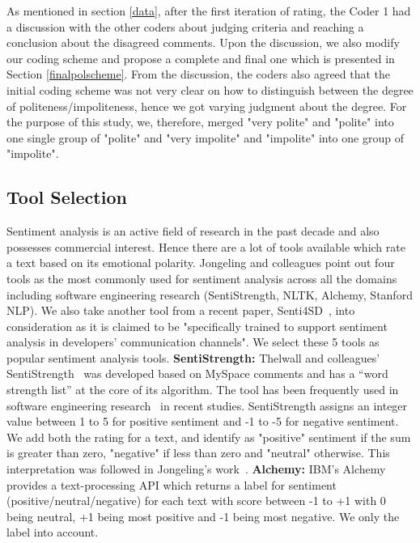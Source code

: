 As mentioned in section \ref{data}, after the first iteration of rating, the Coder 1 had a discussion with the other coders about judging criteria and reaching a conclusion about the disagreed comments. Upon the discussion, we also modify our coding scheme and propose a complete and final one which is presented in Section \ref{finalpolscheme}. From the discussion, the coders also agreed that the initial coding scheme was not very clear on how to distinguish between the degree of politeness/impoliteness, hence we got varying judgment about the degree. For the purpose of this study, we, therefore, merged "very polite" and "polite" into one single group of "polite" and "very impolite" and "impolite" into one group of "impolite".

\subsection{Tool Selection}
Sentiment analysis is an active field of research in the past decade and also possesses commercial interest. Hence there are a lot of tools available which rate a text based on its emotional polarity. Jongeling and colleagues point out four tools as the most commonly used for sentiment analysis across all the domains including software engineering research (SentiStrength, NLTK, Alchemy, Stanford NLP). We also take another tool from a recent paper, Senti4SD~\cite{calefato2017sentiment}, into consideration as it is claimed to be "specifically trained to support sentiment analysis in developers' communication channels". We select these 5 tools as popular sentiment analysis tools.
\newline
\indent \textbf{SentiStrength:} Thelwall and colleagues' SentiStrength~\cite{thelwall2010sentiment} 
was developed based on MySpace comments and 
has a ``word strength list'' at the core of its algorithm. 
The tool has been frequently used in software engineering research~\cite{garcia2013role,guzman2014sentiment,novielli2015challenges,guzman2013towards} in recent studies. SentiStrength assigns an integer value between 1 to 5 for positive sentiment and -1 to -5 for negative sentiment. We add both the rating for a text, and identify as "positive" sentiment if the sum is greater than zero, "negative" if less than zero and "neutral" otherwise. This interpretation was followed in Jongeling's work~\cite{jongeling2017negative}.
\newline
\indent\textbf{Alchemy:} IBM's Alchemy 
provides a text-processing API which returns a label for sentiment (positive/neutral/negative) for each text with score between -1 to +1 with 0 being neutral, +1 being most positive and -1 being most negative. We only the label into account.
